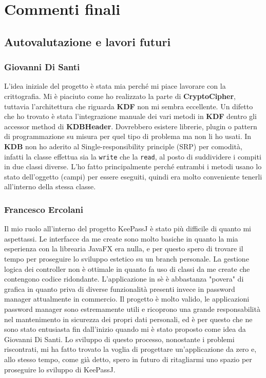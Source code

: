\documentclass[a4paper,12pt]{report}
\begin{document}
\chapter{Commenti finali}

\section{Autovalutazione e lavori futuri}

\subsection*{Giovanni Di Santi}

L'idea iniziale del progetto è stata mia perché mi piace lavorare con la crittografia.
Mi è piaciuto come ho realizzato la parte di \textbf{CryptoCipher}, tuttavia l'architettura
che riguarda \textbf{KDF} non mi sembra eccellente. Un difetto che ho trovato
è stata l'integrazione manuale dei vari metodi in \textbf{KDF} dentro gli accessor
method di \textbf{KDBHeader}.  Dovrebbero esistere librerie, plugin o pattern di
programmazione su misura per quel tipo di problema ma non li ho usati.
In \textbf{KDB} non ho aderito al Single-responsibility principle (SRP) per comodità,
infatti la classe effettua sia la \texttt{write} che la \texttt{read}, al posto di suddividere
i compiti in due classi diverse. L'ho fatto principalmente perché entrambi i metodi
usano lo stato dell'oggetto (campi) per essere eseguiti, quindi era molto conveniente
tenerli all'interno della stessa classe.

\subsection*{Francesco Ercolani}
Il mio ruolo all'interno del progetto KeePassJ è stato più difficile di quanto mi aspettassi. 
Le interfacce da me create sono molto basiche in quanto la mia esperienza con la librearia JavaFX era nulla, 
e per questo spero di trovare il tempo per proseguire lo sviluppo estetico su un branch personale. 
La gestione logica dei controller non è ottimale in quanto fa uso di classi da me create che contengono codice ridondante. 
L'applicazione in sè è abbastanza "povera" di grafica in quanto priva di diverse funzionalità presenti invece in password manager attualmente in commercio.
Il progetto è molto valido, le applicazioni password manager sono estremamente utili e ricoprono una grande 
responsabilità nel mantenimento in sicurezza dei propri dati personali, ed è per questo che ne sono stato entusiasta fin dall'inizio quando mi è stato proposto come idea da Giovanni Di Santi.
Lo sviluppo di questo processo, nonostante i problemi riscontrati, mi ha fatto trovato la voglia di progettare un'applicazione da zero
 e, allo stesso tempo, come già detto, spero in futuro di ritagliarmi uno spazio per proseguire lo sviluppo di KeePassJ.
\end{document}
